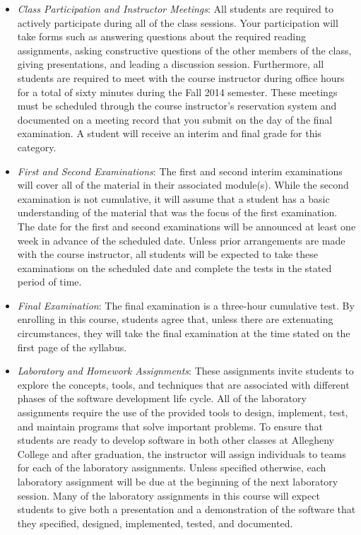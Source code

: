 \begin{itemize}

  \item {\em Class Participation and Instructor Meetings}: All students are required to actively participate during all
    of the class sessions. Your participation will take forms such as answering questions about the required reading
    assignments, asking constructive questions of the other members of the class, giving presentations, and leading a
    discussion session. Furthermore, all students are required to meet with the course instructor during office hours
    for a total of sixty minutes during the Fall 2014 semester.  These meetings must be scheduled through the course
    instructor's reservation system and documented on a meeting record that you submit on the day of the final
    examination. A student will receive an interim and final grade for this category.

  \item {\em First and Second Examinations}: The first and second interim examinations will cover all of the material
    in their associated module(s).  While the second examination is not cumulative, it will assume that a student has a
    basic understanding of the material that was the focus of the first examination.  The date for the first and
    second examinations will be announced at least one week in advance of the scheduled date.  Unless prior
    arrangements are made with the course instructor, all students will be expected to take these examinations on the
    scheduled date and complete the tests in the stated period of time.

  \item {\em Final Examination}: The final examination is a three-hour cumulative test.  By enrolling in this course,
    students agree that, unless there are extenuating circumstances, they will take the final examination at the
    time stated on the first page of the syllabus.

  \item {\em Laboratory and Homework Assignments}: These assignments invite students to explore the concepts, tools,
    and techniques that are associated with different phases of the software development life cycle.  All of the
    laboratory assignments require the use of the provided tools to design, implement, test, and maintain programs
    that solve important problems.  To ensure that students are ready to develop software in both other classes at
    Allegheny College and after graduation, the instructor will assign individuals to teams for each of the
    laboratory assignments.  Unless specified otherwise, each laboratory assignment will be due at the beginning of
    the next laboratory session.  Many of the laboratory assignments in this course will expect students to
    give both a presentation and a demonstration of the software that they specified, designed, implemented, tested,
    and documented.  


\end{itemize}

